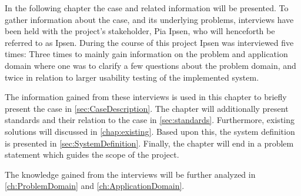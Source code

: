 In the following chapter the case and related information will be presented.
To gather information about the case, and its underlying problems, interviews have been held with the project's stakeholder, Pia Ipsen, who will henceforth be referred to as Ipsen.
During the course of this project Ipsen was interviewed five times:
Three times to mainly gain information on the problem and application domain where one was to clarify a few questions about the problem domain, and twice in relation to larger usability testing of the implemented system.

The information gained from these interviews is used in this chapter to briefly present the case in \cref{sec:CaseDescription}.
The chapter will additionally present standards and their relation to the case in \cref{sec:standards}.
Furthermore, existing solutions will discussed in \cref{chap:existing}.
Based upon this, the system definition is presented in \cref{sec:SystemDefinition}.
Finally, the chapter will end in a problem statement which guides the scope of the project.

The knowledge gained from the interviews will be further analyzed in \cref{ch:ProblemDomain} and \cref{ch:ApplicationDomain}.
